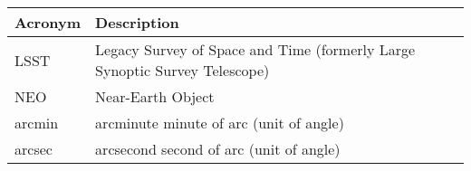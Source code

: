 \addtocounter{table}{-1}
\begin{longtable}{p{}p{}}\hline
\textbf{Acronym} & \textbf{Description}  \\\hline

LSST & Legacy Survey of Space and Time (formerly Large Synoptic Survey Telescope) \\\hline
NEO & Near-Earth Object \\\hline
arcmin & arcminute minute of arc (unit of angle) \\\hline
arcsec & arcsecond second of arc (unit of angle) \\\hline
\end{longtable}
